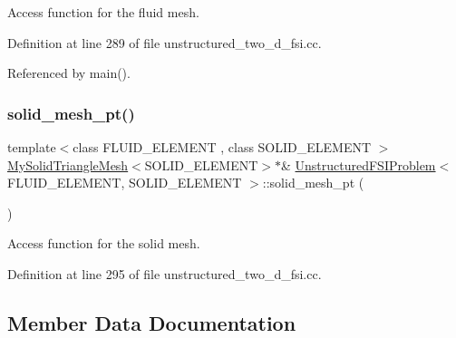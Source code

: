 Access function for the fluid mesh. 



Definition at line 289 of file unstructured\+\_\+two\+\_\+d\+\_\+fsi.\+cc.



Referenced by main().

\mbox{\label{classUnstructuredFSIProblem_ad1430c627842b8ea0a373adcf571647f}} 
\subsubsection{\texorpdfstring{solid\+\_\+mesh\+\_\+pt()}{solid\_mesh\_pt()}}
{\footnotesize\ttfamily template$<$class F\+L\+U\+I\+D\+\_\+\+E\+L\+E\+M\+E\+NT , class S\+O\+L\+I\+D\+\_\+\+E\+L\+E\+M\+E\+NT $>$ \\
\hyperlink{classMySolidTriangleMesh}{My\+Solid\+Triangle\+Mesh}$<$S\+O\+L\+I\+D\+\_\+\+E\+L\+E\+M\+E\+NT$>$$\ast$\& \hyperlink{classUnstructuredFSIProblem}{Unstructured\+F\+S\+I\+Problem}$<$ F\+L\+U\+I\+D\+\_\+\+E\+L\+E\+M\+E\+NT, S\+O\+L\+I\+D\+\_\+\+E\+L\+E\+M\+E\+NT $>$\+::solid\+\_\+mesh\+\_\+pt (\begin{DoxyParamCaption}{ }\end{DoxyParamCaption})\hspace{0.3cm}{\ttfamily [inline]}}



Access function for the solid mesh. 



Definition at line 295 of file unstructured\+\_\+two\+\_\+d\+\_\+fsi.\+cc.



\subsection{Member Data Documentation}
\mbox{\label{classUnstructuredFSIProblem_a33c3b4cd9923f8b25368ff20e4810b2c}} 
